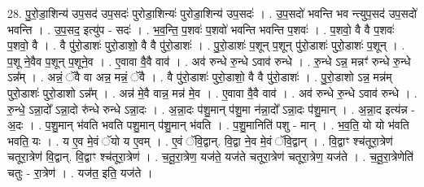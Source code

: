 \documentclass[17pt]{extarticle}
\begin{document}
28. पु॒रो॒डा॒शिन्य॑ उप॒सद॑ उप॒सदः॑ पुरोडा॒शिन्यः॑ पुरोडा॒शिन्य॑ उप॒सदः॑ । . उ॒प॒सदो॑ भवन्ति भव न्त्युप॒सद॑ उप॒सदो॑ भवन्ति । . उ॒प॒सद॒ इत्यु॑प - सदः॑ । . भ॒व॒न्ति॒ प॒शवः॑ प॒शवो॑ भवन्ति भवन्ति प॒शवः॑ । . प॒शवो॒ वै वै प॒शवः॑ प॒शवो॒ वै । . वै पु॑रो॒डाशः॑ पुरो॒डाशो॒ वै वै पु॑रो॒डाशः॑ । . पु॒रो॒डाशः॑ प॒शून् प॒शून् पु॑रो॒डाशः॑ पुरो॒डाशः॑ प॒शून् । . प॒शू ने॒वैव प॒शून् प॒शूने॒व । . ए॒वावा वै॒वै वाव॑ । . अव॑ रुन्धे रु॒न्धे ऽवाव॑ रुन्धे । . रु॒न्धे ऽन्न॒ मन्नꣳ॑ रुन्धे रु॒न्धे ऽन्न᳚म् । . अन्नं॒ ॅवै वा अन्न॒ मन्नं॒ ॅवै । . वै पु॑रो॒डाशः॑ पुरो॒डाशो॒ वै वै पु॑रो॒डाशः॑ । . पु॒रो॒डाशो ऽन्न॒ मन्न॑म् पुरो॒डाशः॑ पुरो॒डाशो ऽन्न᳚म् । . अन्न॑ मे॒वै वान्न॒ मन्न॑ मे॒व । . ए॒वावा वै॒वै वाव॑ । . अव॑ रुन्धे रु॒न्धे ऽवाव॑ रुन्धे । . रु॒न्धे॒ ऽन्ना॒दो᳚ ऽन्ना॒दो रु॑न्धे रुन्धे ऽन्ना॒दः । . अ॒न्ना॒दः प॑शु॒मान् प॑शु॒मा न॑न्ना॒दो᳚ ऽन्ना॒दः प॑शु॒मान् । . अ॒न्ना॒द इत्य॑न्न - अ॒दः । . प॒शु॒मान् भ॑वति भवति पशु॒मान् प॑शु॒मान् भ॑वति । . प॒शु॒मानिति॑ पशु - मान् । . भ॒व॒ति॒ यो यो भ॑वति भवति॒ यः । . य ए॒व मे॒वं ॅयो य ए॒वम् । . ए॒वं ॅवि॒द्वान्. वि॒द्वा ने॒व मे॒वं ॅवि॒द्वान् । . वि॒द्वाꣳ श्च॑तूरा॒त्रेण॑ चतूरा॒त्रेण॑ वि॒द्वान्. वि॒द्वाꣳ श्च॑तूरा॒त्रेण॑ । . च॒तू॒रा॒त्रेण॒ यज॑ते॒ यज॑ते चतूरा॒त्रेण॑ चतूरा॒त्रेण॒ यज॑ते । . च॒तू॒रा॒त्रेणेति॑ चतुः - रा॒त्रेण॑ । . यज॑त॒ इति॒ यज॑ते । \newline
\end{document}
